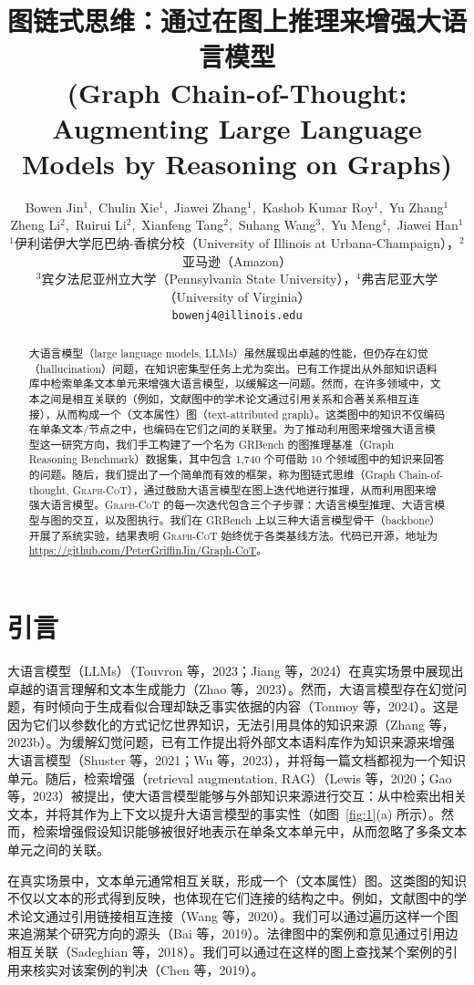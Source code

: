 \documentclass[11pt,UTF8,fontset=fandol]{ctexart}
\title{\textbf{图链式思维：通过在图上推理来增强大语言模型}\\[2pt]\large (Graph Chain-of-Thought: Augmenting Large Language Models by Reasoning on Graphs)}
\author{Bowen Jin$^{1}$,~Chulin Xie$^{1}$,~Jiawei Zhang$^{1}$,~Kashob Kumar Roy$^{1}$,~Yu Zhang$^{1}$\\
Zheng Li$^{2}$,~Ruirui Li$^{2}$,~Xianfeng Tang$^{2}$,~Suhang Wang$^{3}$,~Yu Meng$^{4}$,~Jiawei Han$^{1}$\\[4pt]
\small $^{1}$伊利诺伊大学厄巴纳-香槟分校（University of Illinois at Urbana-Champaign），$^{2}$亚马逊（Amazon）\\
\small $^{3}$宾夕法尼亚州立大学（Pennsylvania State University），$^{4}$弗吉尼亚大学（University of Virginia）\\
\small \texttt{bowenj4@illinois.edu}}
\date{}
\begin{document}
\maketitle

\begin{abstract}
大语言模型（large language models, LLMs）虽然展现出卓越的性能，但仍存在幻觉（hallucination）问题，在知识密集型任务上尤为突出。已有工作提出从外部知识语料库中检索单条文本单元来增强大语言模型，以缓解这一问题。然而，在许多领域中，文本之间是相互关联的（例如，文献图中的学术论文通过引用关系和合著关系相互连接），从而构成一个（文本属性）图（text-attributed graph）。这类图中的知识不仅编码在单条文本/节点之中，也编码在它们之间的关联里。为了推动利用图来增强大语言模型这一研究方向，我们手工构建了一个名为 GRBench 的图推理基准（Graph Reasoning Benchmark）数据集，其中包含 1{,}740 个可借助 10 个领域图中的知识来回答的问题。随后，我们提出了一个简单而有效的框架，称为图链式思维（Graph Chain-of-thought, \textsc{Graph-CoT}），通过鼓励大语言模型在图上迭代地进行推理，从而利用图来增强大语言模型。\textsc{Graph-CoT} 的每一次迭代包含三个子步骤：大语言模型推理、大语言模型与图的交互，以及图执行。我们在 GRBench 上以三种大语言模型骨干（backbone）开展了系统实验，结果表明 \textsc{Graph-CoT} 始终优于各类基线方法。代码已开源，地址为 \url{https://github.com/PeterGriffinJin/Graph-CoT}。
\end{abstract}

\section{引言}

大语言模型（LLMs）（Touvron 等，2023；Jiang 等，2024）在真实场景中展现出卓越的语言理解和文本生成能力（Zhao 等，2023）。然而，大语言模型存在幻觉问题，有时倾向于生成看似合理却缺乏事实依据的内容（Tonmoy 等，2024）。这是因为它们以参数化的方式记忆世界知识，无法引用具体的知识来源（Zhang 等，2023b）。为缓解幻觉问题，已有工作提出将外部文本语料库作为知识来源来增强大语言模型（Shuster 等，2021；Wu 等，2023），并将每一篇文档都视为一个知识单元。随后，检索增强（retrieval augmentation, RAG）（Lewis 等，2020；Gao 等，2023）被提出，使大语言模型能够与外部知识来源进行交互：从中检索出相关文本，并将其作为上下文以提升大语言模型的事实性（如图~\ref{fig:1}(a) 所示）。然而，检索增强假设知识能够被很好地表示在单条文本单元中，从而忽略了多条文本单元之间的关联。

在真实场景中，文本单元通常相互关联，形成一个（文本属性）图。这类图的知识不仅以文本的形式得到反映，也体现在它们连接的结构之中。例如，文献图中的学术论文通过引用链接相互连接（Wang 等，2020）。我们可以通过遍历这样一个图来追溯某个研究方向的源头（Bai 等，2019）。法律图中的案例和意见通过引用边相互关联（Sadeghian 等，2018）。我们可以通过在这样的图上查找某个案例的引用来核实对该案例的判决（Chen 等，2019）。
\end{document}
